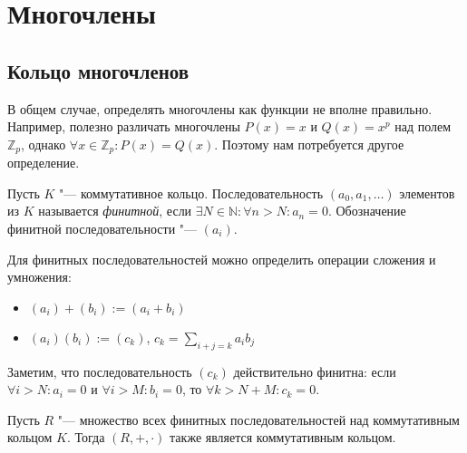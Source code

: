 \section{Многочлены}

\subsection{Кольцо многочленов}

\begin{note}
	В общем случае, определять многочлены как функции не вполне правильно. Например, полезно различать многочлены $P(x) = x$ и $Q(x) = x^p$ над полем $\mathbb{Z}_p$, однако $\forall x \in \mathbb{Z}_p: P(x) = Q(x)$. Поэтому нам потребуется другое определение.
\end{note}

\begin{definition}
	Пусть $K$ "--- коммутативное кольцо. Последовательность $(a_0, a_1, \dots)$ элементов из $K$ называется \textit{финитной}, если $\exists N \in \mathbb{N}: \forall n > N: a_n = 0$. Обозначение финитной последовательности "--- $(a_i)$.
\end{definition}

\begin{definition}
	Для финитных последовательностей можно определить операции сложения и умножения:
	\begin{itemize}
		\item $(a_i) + (b_i) := (a_i + b_i)$
		\item $(a_i)(b_i) := (c_k)$, $c_k = \sum_{i + j = k}a_ib_j$
	\end{itemize}

	Заметим, что последовательность $(c_k)$ действительно финитна: если $\forall i > N: a_i = 0$ и $\forall i > M: b_i = 0$, то $\forall k > N + M: c_k = 0$.
\end{definition}

\begin{theorem}
	Пусть $R$ "--- множество всех финитных последовательностей над коммутативным кольцом $K$. Тогда $(R, +, \cdot)$ также является коммутативным кольцом.
\end{theorem}

